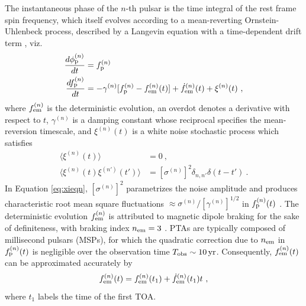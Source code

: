 \documentclass[fleqn,usenatbib,useAMS]{mnras}
\begin{document}
The instantaneous phase of the $n$-th pulsar is the time integral of the rest frame spin frequency, which itself evolves according to a mean-reverting Ornstein-Uhlenbeck process, described by a Langevin equation with a time-dependent drift term \citep{Vargas}, viz.
\begin{align}
	\frac{d \phi_{\rm p}^{(n)}}{dt} &= f_{\rm p}^{(n)} \\ 
	\frac{df_{\rm p}^{(n)}}{dt} &= -\gamma^{(n)}	 [f_{\rm p}^{(n)} - f_{\rm em}^{(n)} (t)] + \dot{f}_{\rm em}^{(n)}(t) +\xi^{(n)}(t) \ , 
	\label{eq:frequency_evolution}
\end{align}
where $f_{\rm em}^{(n)}$ is the deterministic evolution, an overdot denotes a derivative with respect to $t$, $\gamma^{(n)}$ is a damping constant whose reciprocal specifies the mean-reversion timescale, and $\xi^{(n)}(t)$ is a white noise stochastic process which satisfies
\begin{align}
	\langle \xi^{(n)}(t) \rangle &= 0 \ , \\
	\langle \xi^{(n)}(t) \xi^{(n')}(t') \rangle &= [\sigma^{(n)}]^2 \delta_{n,n'} \delta(t - t') \ .	\label{eq:xieqn}
\end{align}
In Equation \eqref{eq:xieqn}, $[\sigma^{(n)}]^2$ parametrizes the noise amplitude and produces characteristic root mean square fluctuations $\approx \sigma^{(n)} / [\gamma^{(n)}]^{1/2}$ in $f_{\rm p}^{(n)}(t)$ \citep{gardiner2009stochastic}. The deterministic evolution $f_{\rm em}^{(n)}$ is attributed to magnetic dipole braking for the sake of definiteness, with braking index $n_{\rm em}=3$ \citep{1969ApJ...157..869G}. PTAs are typically composed of millisecond pulsars (MSPs), for which the quadratic correction due to $n_{\rm em}$ in $f_{\rm p}^{(n)}(t)$ is negligible over the observation time $T_{\rm obs} \sim 10 \, {\rm yr}$. Consequently, 	$f_{\rm em}^{(n)}(t)$ can be approximated accurately by 
\begin{equation}
	f_{\rm em}^{(n)}(t) = f_{\rm em}^{(n)}(t_1) + \dot{f}_{\rm em}^{(n)}(t_1)t \ , \label{eq:spinevol}
\end{equation} 
where $t_1$ labels the time of the first TOA. \newline 
\end{document}
